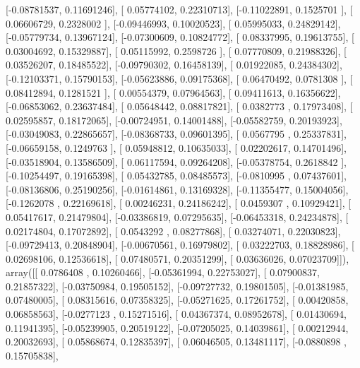 \documentclass{article}
\begin{document}
       [-0.08781537,  0.11691246],
       [ 0.05774102,  0.22310713],
       [-0.11022891,  0.1525701 ],
       [ 0.06606729,  0.2328002 ],
       [-0.09446993,  0.10020523],
       [ 0.05995033,  0.24829142],
       [-0.05779734,  0.13967124],
       [-0.07300609,  0.10824772],
       [ 0.08337995,  0.19613755],
       [ 0.03004692,  0.15329887],
       [ 0.05115992,  0.2598726 ],
       [ 0.07770809,  0.21988326],
       [ 0.03526207,  0.18485522],
       [-0.09790302,  0.16458139],
       [ 0.01922085,  0.24384302],
       [-0.12103371,  0.15790153],
       [-0.05623886,  0.09175368],
       [ 0.06470492,  0.0781308 ],
       [ 0.08412894,  0.1281521 ],
       [ 0.00554379,  0.07964563],
       [ 0.09411613,  0.16356622],
       [-0.06853062,  0.23637484],
       [ 0.05648442,  0.08817821],
       [ 0.0382773 ,  0.17973408],
       [ 0.02595857,  0.18172065],
       [-0.00724951,  0.14001488],
       [-0.05582759,  0.20193923],
       [-0.03049083,  0.22865657],
       [-0.08368733,  0.09601395],
       [ 0.0567795 ,  0.25337831],
       [-0.06659158,  0.1249763 ],
       [ 0.05948812,  0.10635033],
       [ 0.02202617,  0.14701496],
       [-0.03518904,  0.13586509],
       [ 0.06117594,  0.09264208],
       [-0.05378754,  0.2618842 ],
       [-0.10254497,  0.19165398],
       [ 0.05432785,  0.08485573],
       [-0.0810995 ,  0.07437601],
       [-0.08136806,  0.25190256],
       [-0.01614861,  0.13169328],
       [-0.11355477,  0.15004056],
       [-0.1262078 ,  0.22169618],
       [ 0.00246231,  0.24186242],
       [ 0.0459307 ,  0.10929421],
       [ 0.05417617,  0.21479804],
       [-0.03386819,  0.07295635],
       [-0.06453318,  0.24234878],
       [ 0.02174804,  0.17072892],
       [ 0.0543292 ,  0.08277868],
       [ 0.03274071,  0.22030823],
       [-0.09729413,  0.20848904],
       [-0.00670561,  0.16979802],
       [ 0.03222703,  0.18828986],
       [ 0.02698106,  0.12536618],
       [ 0.07480571,  0.20351299],
       [ 0.03636026,  0.07023709]]), array([[ 0.0786408 ,  0.10260466],
       [-0.05361994,  0.22753027],
       [ 0.07900837,  0.21857322],
       [-0.03750984,  0.19505152],
       [-0.09727732,  0.19801505],
       [-0.01381985,  0.07480005],
       [ 0.08315616,  0.07358325],
       [-0.05271625,  0.17261752],
       [ 0.00420858,  0.06858563],
       [-0.0277123 ,  0.15271516],
       [ 0.04367374,  0.08952678],
       [ 0.01430694,  0.11941395],
       [-0.05239905,  0.20519122],
       [-0.07205025,  0.14039861],
       [ 0.00212944,  0.20032693],
       [ 0.05868674,  0.12835397],
       [ 0.06046505,  0.13481117],
       [-0.0880898 ,  0.15705838],
\end{document}
